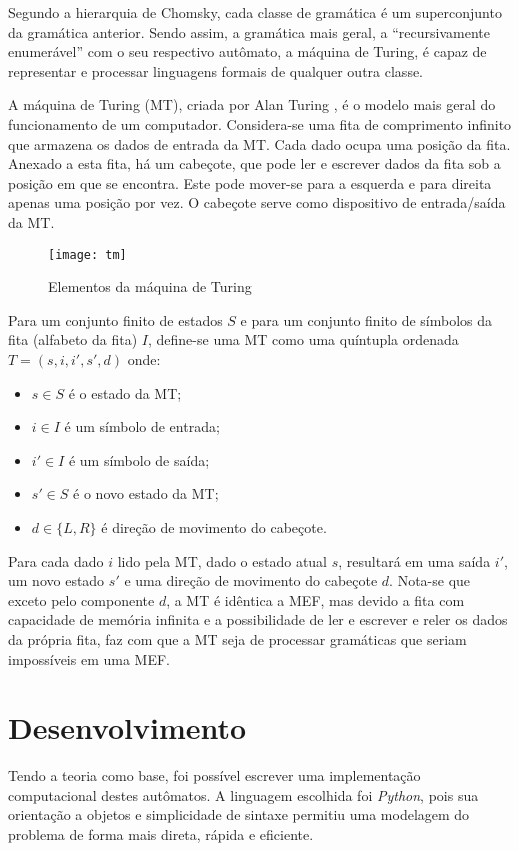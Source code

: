 Segundo a hierarquia de Chomsky, cada classe de gramática é um superconjunto da
gramática anterior. Sendo assim, a gramática mais geral, a ``recursivamente
enumerável'' com o seu respectivo autômato, a máquina de Turing, é capaz de
representar e processar linguagens formais de qualquer outra classe.

A máquina de Turing (MT), criada por Alan Turing \cite{turing}, é o modelo mais
geral do
funcionamento de um
computador. Considera-se uma fita de comprimento infinito que armazena os dados
de entrada da MT. Cada dado ocupa uma posição da fita. Anexado a esta fita, há
um cabeçote, que pode ler e escrever dados da fita sob a posição em que se
encontra. Este pode mover-se para a esquerda e para direita apenas uma posição
por vez. O cabeçote serve como dispositivo de entrada/saída da MT.

\begin{figure}[H]
    \centering
    \texttt{[image: tm]}
    \label{tm}
    \caption{Elementos da máquina de Turing}
\end{figure}

Para um conjunto finito de estados $S$ e para um conjunto finito de símbolos da
fita (alfabeto da fita) $I$, define-se uma MT como uma quíntupla ordenada $T =
(s, i, i', s', d)$ onde:
\begin{itemize}
    \item $s \in S$ é o estado da MT;
    \item $i \in I$ é um símbolo de entrada;
    \item $i' \in I$ é um símbolo de saída;
    \item $s' \in S$ é o novo estado da MT;
    \item $d \in \{L,R\}$ é direção de movimento do cabeçote.
\end{itemize}

Para cada dado $i$ lido pela MT, dado o estado atual $s$, resultará em uma
saída $i'$, um novo estado $s'$ e uma direção de movimento do cabeçote $d$.
Nota-se que exceto pelo componente $d$, a MT é idêntica a MEF, mas devido a
fita com capacidade de memória infinita e a possibilidade de ler e escrever e
reler os dados da própria fita, faz com que a MT seja de processar gramáticas
que seriam impossíveis em uma MEF.

\section{Desenvolvimento}

Tendo a teoria como base, foi possível escrever uma implementação computacional
destes autômatos. A linguagem escolhida foi \textit{Python}, pois sua
orientação a objetos e simplicidade de sintaxe permitiu uma modelagem do
problema de forma mais direta, rápida e eficiente.

